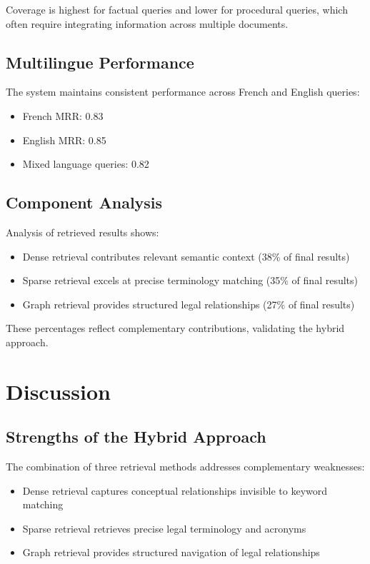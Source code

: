 \documentclass[11pt,a4paper]{article}
\begin{document}
Coverage is highest for factual queries and lower for procedural queries, which often require integrating information across multiple documents.

\subsection{Multilingue Performance}

The system maintains consistent performance across French and English queries:
\begin{itemize}
\item French MRR: 0.83
\item English MRR: 0.85
\item Mixed language queries: 0.82
\end{itemize}

\subsection{Component Analysis}

Analysis of retrieved results shows:
\begin{itemize}
\item Dense retrieval contributes relevant semantic context (38\% of final results)
\item Sparse retrieval excels at precise terminology matching (35\% of final results)
\item Graph retrieval provides structured legal relationships (27\% of final results)
\end{itemize}

These percentages reflect complementary contributions, validating the hybrid approach.

\section{Discussion}

\subsection{Strengths of the Hybrid Approach}

The combination of three retrieval methods addresses complementary weaknesses:
\begin{itemize}
\item Dense retrieval captures conceptual relationships invisible to keyword matching
\item Sparse retrieval retrieves precise legal terminology and acronyms
\item Graph retrieval provides structured navigation of legal relationships
\end{itemize}
\end{document}

